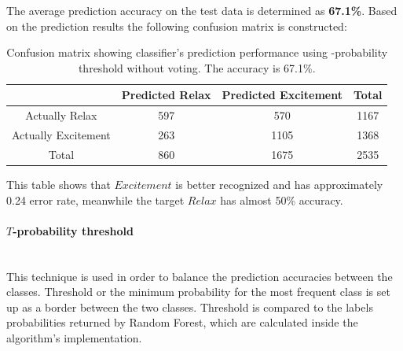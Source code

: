 \documentclass[12pt]{article}
\theoremstyle{definition}
\begin{document}
The average prediction accuracy on the test data is determined as \textbf{67.1\%}. Based on the prediction results the following confusion matrix is constructed:
\begin{table}[H]
 \label{tab:title} 
\begin{center}
  \begin{tabular}{ | c | c | c | c | }
    \hline
     & Predicted Relax & Predicted Excitement & Total \\ \hline
    Actually Relax & 597 & 570 & 1167 \\ \hline
    Actually Excitement & 263 & 1105 & 1368 \\ \hline
    Total & 860 & 1675 & 2535 \\ 
    \hline
  \end{tabular}
\end{center}
\caption{Confusion matrix showing classifier's prediction performance using -probability threshold without voting. The accuracy is 67.1\%.}
\end{table}

This table shows that $Excitement$ is better recognized and has approximately 0.24 error rate, meanwhile the target $Relax$ has almost 50\% accuracy.

\paragraph{$T$-probability threshold}~\\

This technique is used in order to balance the prediction accuracies between the classes. Threshold or the minimum probability for the most frequent class is set up as a border between the two classes. Threshold is compared to the labels probabilities returned by Random Forest, which are calculated inside the algorithm's implementation. 
\end{document}
